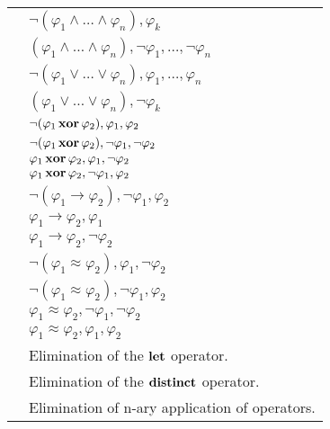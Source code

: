 \begin{xltabular}{\linewidth}{l X}
 & $\neg (\varphi_1 \land \dots \land \varphi_n), \varphi_k$\\
 & $(\varphi_1 \land \dots \land \varphi_n), \neg\varphi_1, \dots , \neg\varphi_n $ \\
 & $\neg (\varphi_1 \lor \dots \lor \varphi_n) , \varphi_1 , \dots
  , \varphi_n $ \\
 &
$ (\varphi_1 \lor \dots \lor \varphi_n) , \neg \varphi_k $\\
 &
$ \neg (\varphi_1 \,\mathbf{xor}\, \varphi_2) , \varphi_1 , \varphi_2 $ \\
 &
$ \neg (\varphi_1 \,\mathbf{xor}\, \varphi_2)
, \neg \varphi_1, \neg \varphi_2 $ \\
 &
$ \varphi_1 \,\mathbf{xor}\, \varphi_2, \varphi_1 , \neg \varphi_2 $ \\
 &
$ \varphi_1 \,\mathbf{xor}\, \varphi_2, \neg \varphi_1 , \varphi_2 $ \\
 &
$ \neg (\varphi_1 \rightarrow \varphi_2), \neg \varphi_1 , \varphi_2 $ \\
 &
$ \varphi_1 \rightarrow \varphi_2, \varphi_1 $ \\
 &
$ \varphi_1 \rightarrow \varphi_2, \neg \varphi_2 $ \\
 &
$\neg (\varphi_1 ≈ \varphi_2) , \varphi_1 , \neg \varphi_2$ \\
 &
$\neg (\varphi_1 ≈ \varphi_2) , \neg \varphi_1 , \varphi_2$ \\
 &
$\varphi_1 ≈ \varphi_2 , \neg \varphi_1 , \neg \varphi_2$ \\
 &
$\varphi_1 ≈ \varphi_2 , \varphi_1 , \varphi_2$ \\
 & Elimination of the $\mathbf{let}$ operator.  \\
 & Elimination of the $\mathbf{distinct}$ operator.  \\
 & Elimination of n-ary application of operators. \\
\end{xltabular}

